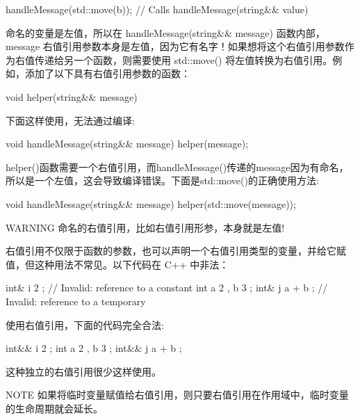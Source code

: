 \begin{cpp}
handleMessage(std::move(b)); // Calls handleMessage(string&& value)
\end{cpp}

命名的变量是左值，所以在 handleMessage(string\&\& message) 函数内部，message 右值引用参数本身是左值，因为它有名字！如果想将这个右值引用参数作为右值传递给另一个函数，则需要使用 std::move() 将左值转换为右值引用。例如，添加了以下具有右值引用参数的函数：

\begin{cpp}
void helper(string&& message) { }
\end{cpp}

下面这样使用，无法通过编译:

\begin{cpp}
void handleMessage(string&& message) { helper(message); }
\end{cpp}

helper()函数需要一个右值引用，而handleMessage()传递的message因为有命名，所以是一个左值，这会导致编译错误。下面是std::move()的正确使用方法:

\begin{cpp}
void handleMessage(string&& message) { helper(std::move(message)); }
\end{cpp}

\begin{myWarning}{WARNING}
命名的右值引用，比如右值引用形参，本身就是左值!
\end{myWarning}

右值引用不仅限于函数的参数，也可以声明一个右值引用类型的变量，并给它赋值，但这种用法不常见。以下代码在 C++ 中非法：

\begin{cpp}
int& i { 2 }; // Invalid: reference to a constant
int a { 2 }, b { 3 };
int& j { a + b }; // Invalid: reference to a temporary
\end{cpp}

使用右值引用，下面的代码完全合法:

\begin{cpp}
int&& i { 2 };
int a { 2 }, b { 3 };
int&& j { a + b };
\end{cpp}

这种独立的右值引用很少这样使用。

\begin{myNotic}{NOTE}
如果将临时变量赋值给右值引用，则只要右值引用在作用域中，临时变量的生命周期就会延长。
\end{myNotic}


